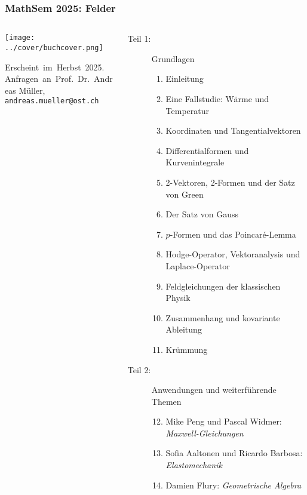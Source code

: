\documentclass[handout]{beamer}
\title[]{}
\begin{document}
\begin{frame}
\frametitle{%
MathSem 2025: Felder}
\vspace*{-0.1cm}
\begin{columns}[t,onlytextwidth]
\begin{column}{0.37\textwidth}
\begin{center}
\texttt{[image: ../cover/buchcover.png]}
\end{center}
\bigskip
\bigskip
Erscheint~im~Herbst~2025.\\
Anfragen~an~Prof.~Dr.~Andreas Müller,\\
{\texttt{andreas.mueller@ost.ch}}
\bigskip
\bigskip
\bigskip
\end{column}
%
\begin{column}{0.60\textwidth}
\begin{description}
\item[Teil 1:] Grundlagen
\begin{enumerate}
\item Einleitung
\item Eine Fallstudie: Wärme und Temperatur
\item Koordinaten und Tangentialvektoren
\item Differentialformen und Kurvenintegrale
\item 2-Vektoren, 2-Formen und der Satz von Green
\item Der Satz von Gauss
\item $p$-Formen und das Poincaré-Lemma
\item Hodge-Operator, Vektoranalysis und Laplace-Operator
\item Feldgleichungen der klassischen Physik
\item Zusammenhang und kovariante Ableitung
\item Krümmung
\end{enumerate}
\item[Teil 2:] Anwendungen und weiterführende Themen
\begin{enumerate}
\setcounter{enumi}{11}
\item Mike Peng und Pascal Widmer: {\em Maxwell-Gleichungen}
\item Sofia Aaltonen und Ricardo Barbosa: {\em Elastomechanik}
\item Damien Flury: {\em Geometrische Algebra}

\end{enumerate}
\end{description}
\end{column}
\end{columns}
\end{frame}
\end{document}
